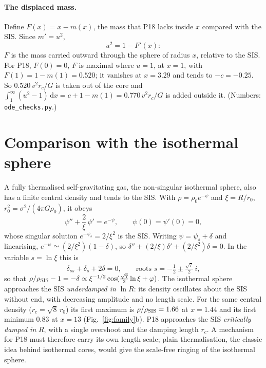 \documentclass[11pt,a4paper]{article}
\theoremstyle{remark}
\newcommand{\rc}{r_c}
\newcommand{\dd}{\mathrm{d}}
\begin{document}
\paragraph{The displaced mass.} Define $F(x)=x-m(x)$, the mass that P18 lacks inside
$x$ compared with the SIS. Since $m'=u^2$,
\begin{equation}
  u^2=1-F'(x):
  \label{eq:flux}
\end{equation}
$F$ is the mass carried outward through the sphere of radius $x$, relative to the SIS.
For P18, $F(0)=0$, $F$ is maximal where $u=1$, at $x=1$, with $F(1)=1-m(1)=0.520$;
it vanishes at $x=3.29$ and tends to $-c=-0.25$. So $0.520\,v^2\rc/G$ is taken out of
the core and $\int_1^\infty(u^2-1)\,\dd x=c+1-m(1)=0.770\,v^2\rc/G$ is added outside
it. (Numbers: \texttt{ode\_checks.py}.)

\section{Comparison with the isothermal sphere}\label{sec:emden}

A fully thermalised self-gravitating gas, the non-singular isothermal sphere, also has
a finite central density and tends to the SIS. With $\rho=\rho_0e^{-\psi}$ and
$\xi=R/r_0$, $r_0^2=\sigma^2/(4\pi G\rho_0)$, it obeys
\begin{equation}
  \psi''+\frac2\xi\,\psi'=e^{-\psi},\qquad \psi(0)=\psi'(0)=0,
\end{equation}
whose singular solution $e^{-\psi_s}=2/\xi^2$ is the SIS. Writing $\psi=\psi_s+\delta$
and linearising, $e^{-\psi}\simeq(2/\xi^2)(1-\delta)$, so
$\delta''+(2/\xi)\delta'+(2/\xi^2)\delta=0$. In the variable $s=\ln\xi$ this is
\begin{equation}
  \delta_{ss}+\delta_s+2\delta=0,\qquad\text{roots }s=-\tfrac12\pm\tfrac{\sqrt7}{2}\,i,
\end{equation}
so that $\rho/\rho_{\rm SIS}-1=-\delta\propto\xi^{-1/2}\cos(\tfrac{\sqrt7}{2}\ln\xi+
\varphi)$. The isothermal sphere approaches the SIS \emph{underdamped in} $\ln R$: its
density oscillates about the SIS without end, with decreasing amplitude and no length
scale. For the same central density ($\rc=\sqrt8\,r_0$) its first maximum is
$\rho/\rho_{\rm SIS}=1.66$ at $x=1.44$ and its first minimum 0.83 at $x=13$
(Fig.~\ref{fig:family}b). P18 approaches the SIS \emph{critically damped in} $R$, with
a single overshoot and the damping length $\rc$. A mechanism for P18 must therefore
carry its own length scale; plain thermalisation, the classic idea behind isothermal
cores, would give the scale-free ringing of the isothermal sphere.
\end{document}
